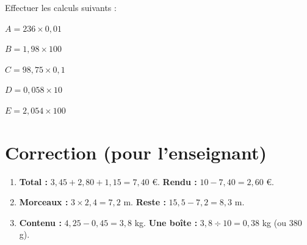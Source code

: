 \documentclass[a4paper]{book}
\begin{document}
    \begin{exercice}
        Effectuer les calculs suivants :

        \medskip

        \begin{minipage}{0.18\linewidth}
            $A=236\times0,01$

            \vspace{1cm}
        \end{minipage}
        \hfill \vline \hfill
        \begin{minipage}{0.18\linewidth}
            $B=1,98\times100$

            \vspace{1cm}
        \end{minipage}
        \hfill \vline \hfill
        \begin{minipage}{0.18\linewidth}
            $C=98,75\times0,1$

            \vspace{1cm}
        \end{minipage}
        \hfill \vline \hfill
        \begin{minipage}{0.18\linewidth}
            $D=0,058\times10$

            \vspace{1cm}
        \end{minipage}
        \hfill \vline \hfill
        \begin{minipage}{0.18\linewidth}
            $E=2,054\times100$

            \vspace{1cm}       
        \end{minipage}  
    \end{exercice}


\newpage

        
    \section*{Correction (pour l'enseignant)}
        \begin{enumerate}
            \item \textbf{Total :} $3,45 + 2,80 + 1,15 = 7,40$ \euro. \textbf{Rendu :} $10 - 7,40 = 2,60$ \euro.
            \item \textbf{Morceaux :} $3 \times 2,4 = 7,2$ m. \textbf{Reste :} $15,5 - 7,2 = 8,3$ m.
            \item \textbf{Contenu :} $4,25 - 0,45 = 3,8$ kg. \textbf{Une boîte :} $3,8 \div 10 = 0,38$ kg (ou $380$ g).
        \end{enumerate}
        
\end{document}
